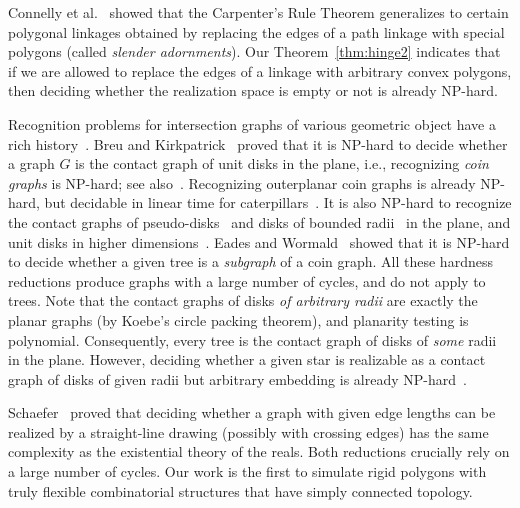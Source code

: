 Connelly et al.~\cite{CDD+10} showed that the Carpenter's Rule Theorem generalizes to certain polygonal linkages obtained by replacing the edges of a path linkage with special polygons (called \emph{slender adornments}). Our Theorem~\ref{thm:hinge2} indicates that if we are allowed to replace the edges of a linkage with arbitrary convex polygons, then deciding whether the realization space is empty or not is already NP-hard.

Recognition problems for intersection graphs of various geometric object have a rich history~\cite{HK01}.
Breu and Kirkpatrick~\cite{BK98} proved that it is NP-hard to decide whether a graph $G$ is the contact graph of unit disks in the plane, i.e., recognizing \emph{coin graphs} is NP-hard; see also~\cite{BET+99}. Recognizing outerplanar coin graphs is already NP-hard, but decidable in linear time for caterpillars~\cite{KNR15}. It is also NP-hard to recognize the contact graphs of pseudo-disks~\cite{HK01} and disks of bounded radii~\cite{BK95} in the plane, and unit disks in higher dimensions~\cite{Hli97,HK01}. Eades and Wormald~\cite{EW90} showed that it is NP-hard to decide whether a given tree is a \emph{subgraph} of a coin graph. All these hardness reductions produce graphs with a large number of cycles, and do not apply to trees. Note that the contact graphs of disks \emph{of arbitrary radii} are exactly the planar graphs (by Koebe's circle packing theorem), and planarity testing is polynomial. Consequently, every tree is the contact graph of disks of \emph{some} radii in the plane.
However, deciding whether a given star is realizable as a contact graph of disks of given radii but arbitrary embedding is already NP-hard~\cite{KNR15}.

Schaefer~\cite{Sch13} proved that deciding whether a graph with given edge lengths can be realized by a straight-line drawing (possibly with crossing edges) has the same complexity as the existential theory of the reals. Both reductions crucially rely on a large number of cycles. Our work is the first to simulate rigid polygons with truly flexible combinatorial structures that have simply connected topology.

